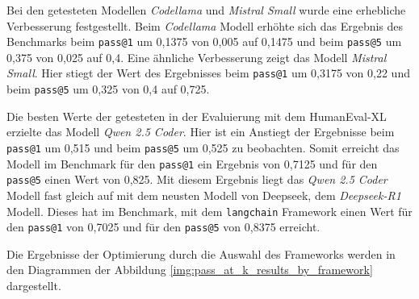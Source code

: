 Bei den getesteten Modellen \textit{Codellama} und \textit{Mistral Small} wurde eine erhebliche Verbesserung festgestellt. Beim \textit{Codellama} Modell erhöhte sich das Ergebnis des Benchmarks beim \texttt{pass@1} um 0,1375 von 0,005 auf 0,1475 und beim \texttt{pass@5} um 0,375 von 0,025 auf 0,4. Eine ähnliche Verbesserung zeigt das Modell \textit{Mistral Small}. Hier stiegt der Wert des Ergebnisses beim \texttt{pass@1} um 0,3175 von 0,22 und beim \texttt{pass@5} um 0,325 von 0,4 auf 0,725.\vspace{0.2cm}

Die besten Werte der getesteten in der Evaluierung mit dem HumanEval-XL erzielte das Modell \textit{Qwen 2.5 Coder}. Hier ist ein Anstiegt der Ergebnisse beim \texttt{pass@1} um 0,515 und beim \texttt{pass@5} um 0,525 zu beobachten. Somit erreicht das Modell im Benchmark für den \texttt{pass@1} ein Ergebnis von 0,7125 und für den \texttt{pass@5} einen Wert von 0,825. Mit diesem Ergebnis liegt das \textit{Qwen 2.5 Coder} Modell fast gleich auf mit dem neusten Modell von Deepseek, dem \textit{Deepseek-R1} Modell. Dieses hat im Benchmark, mit dem \texttt{langchain} Framework einen Wert für den \texttt{pass@1} von 0,7025 und für den \texttt{pass@5} von 0,8375 erreicht.\vspace{0.2cm}

Die Ergebnisse der Optimierung durch die Auswahl des Frameworks werden in den Diagrammen der Abbildung \ref{img:pass_at_k_results_by_framework} dargestellt.

